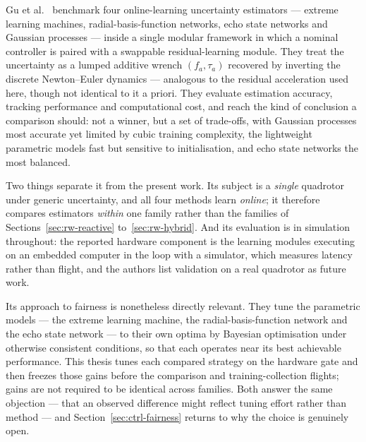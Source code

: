 Gu et al.~\cite{gu2025comparative} benchmark four online-learning uncertainty estimators ---
extreme learning machines, radial-basis-function networks, echo state networks and Gaussian
processes --- inside a single modular framework in which a nominal controller is paired with a
swappable residual-learning module. They treat the uncertainty as a lumped additive wrench
\((f_a, \tau_a)\) recovered by inverting the discrete Newton--Euler dynamics --- analogous to the
residual acceleration used here, though not identical to it a priori. They evaluate estimation accuracy, tracking
performance and computational cost, and reach the kind of conclusion a comparison should: not a
winner, but a set of trade-offs, with Gaussian processes most accurate yet limited by cubic
training complexity, the lightweight parametric models fast but sensitive to initialisation, and
echo state networks the most balanced.

Two things separate it from the present work. Its subject is a \emph{single} quadrotor under
generic uncertainty, and all four methods learn \emph{online}; it therefore compares estimators
\emph{within} one family rather than the families of Sections~\ref{sec:rw-reactive}
to~\ref{sec:rw-hybrid}. And its evaluation is in simulation throughout: the reported hardware
component is the learning modules executing on an embedded computer in the loop with a simulator,
which measures latency rather than flight, and the authors list validation on a real quadrotor as
future work.

Its approach to fairness is nonetheless directly relevant. They tune the parametric models --- the
extreme learning machine, the radial-basis-function network and the echo state network --- to their
own optima by Bayesian optimisation under otherwise consistent conditions, so that each operates
near its best achievable performance. This thesis tunes each compared strategy on the hardware gate
and then freezes those gains before the comparison and training-collection flights; gains are not
required to be identical across families. Both answer the same objection --- that an observed
difference might reflect tuning effort rather than method --- and Section~\ref{sec:ctrl-fairness}
returns to why the choice is genuinely open.

